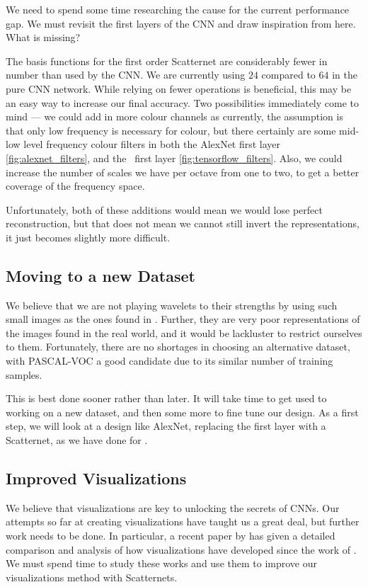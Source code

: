   We need to spend some time researching the cause for the current performance
  gap. We must revisit the first layers of the CNN and draw inspiration from
  here. What is missing?

  The basis functions for the first order Scatternet are considerably fewer in
  number than used by the CNN\@. We are currently using $24$ compared to $64$
  in the pure CNN network. While relying on fewer operations is beneficial,
  this may be an easy way to increase our final accuracy. Two possibilities
  immediately come to mind --- we could add in more colour channels as
  currently, the assumption is that only low frequency is necessary for colour,
  but there certainly are some mid-low level frequency colour filters in both
  the AlexNet first layer \autoref{fig:alexnet_filters}, and the \cifar\ first
  layer \autoref{fig:tensorflow_filters}. Also, we could increase the number of
  scales we have per octave from one to two, to get a better coverage of the
  frequency space.
  
  Unfortunately, both of these additions would mean we would lose perfect
  reconstruction, but that does not mean we cannot still invert the
  representations, it just becomes slightly more difficult.

\subsection{Moving to a new Dataset}\label{sec:new_dataset}
  We believe that we are not playing wavelets to their strengths by using such
  small images as the ones found in \cifar. Further, they are very poor
  representations of the images found in the real world, and it would be
  lackluster to restrict ourselves to them. Fortunately, there are no shortages
  in choosing an alternative dataset, with PASCAL-VOC a good candidate due to
  its similar number of training samples.

  This is best done sooner rather than later. It will take time to get used to
  working on a new dataset, and then some more to fine tune our design. As
  a first step, we will look at a design like AlexNet, replacing the first layer with
  a Scatternet, as we have done for \cifar.

\subsection{Improved Visualizations}\label{sec:visualizations}
  We believe that visualizations are key to unlocking the secrets of CNNs. Our
  attempts so far at creating visualizations have taught us a great deal, but
  further work needs to be done. In particular, a recent paper by
  \citet{grun_taxonomy_2016} has given a detailed comparison and analysis of
  how visualizations have developed since the work of
  \citet{zeiler_visualizing_compact_2014}. We must spend time to study these
  works and use them to improve our visualizations method with Scatternets.

